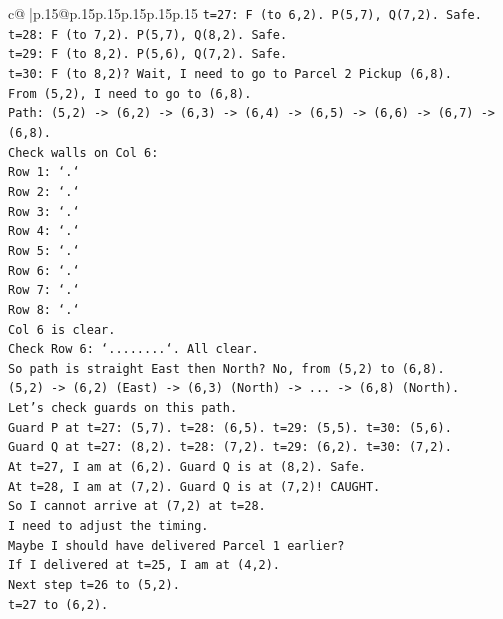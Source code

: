 \documentclass{article}
\begin{document}
{\begin{supertabular}{c@{$\;$}|p{.15\linewidth}@{}p{.15\linewidth}p{.15\linewidth}p{.15\linewidth}p{.15\linewidth}p{.15\linewidth}}
{{{\texttt{t=27: F (to 6,2). P(5,7), Q(7,2). Safe.} \\
\texttt{t=28: F (to 7,2). P(5,7), Q(8,2). Safe.} \\
\texttt{t=29: F (to 8,2). P(5,6), Q(7,2). Safe.} \\
\texttt{t=30: F (to 8,2)? Wait, I need to go to Parcel 2 Pickup (6,8).} \\
\texttt{From (5,2), I need to go to (6,8).} \\
\texttt{Path: (5,2) {-}> (6,2) {-}> (6,3) {-}> (6,4) {-}> (6,5) {-}> (6,6) {-}> (6,7) {-}> (6,8).} \\
\texttt{Check walls on Col 6:} \\
\texttt{Row 1: `.`} \\
\texttt{Row 2: `.`} \\
\texttt{Row 3: `.`} \\
\texttt{Row 4: `.`} \\
\texttt{Row 5: `.`} \\
\texttt{Row 6: `.`} \\
\texttt{Row 7: `.`} \\
\texttt{Row 8: `.`} \\
\texttt{Col 6 is clear.} \\
\texttt{Check Row 6: `........`. All clear.} \\
\texttt{So path is straight East then North? No, from (5,2) to (6,8).} \\
\texttt{(5,2) {-}> (6,2) (East) {-}> (6,3) (North) {-}> ... {-}> (6,8) (North).} \\
\texttt{Let's check guards on this path.} \\
\texttt{Guard P at t=27: (5,7). t=28: (6,5). t=29: (5,5). t=30: (5,6).} \\
\texttt{Guard Q at t=27: (8,2). t=28: (7,2). t=29: (6,2). t=30: (7,2).} \\
\texttt{At t=27, I am at (6,2). Guard Q is at (8,2). Safe.} \\
\texttt{At t=28, I am at (7,2). Guard Q is at (7,2)! CAUGHT.} \\
\texttt{So I cannot arrive at (7,2) at t=28.} \\
\texttt{I need to adjust the timing.} \\
\texttt{Maybe I should have delivered Parcel 1 earlier?} \\
\texttt{If I delivered at t=25, I am at (4,2).} \\
\texttt{Next step t=26 to (5,2).} \\
\texttt{t=27 to (6,2).} \\
}}}
\end{supertabular}}
\end{document}
